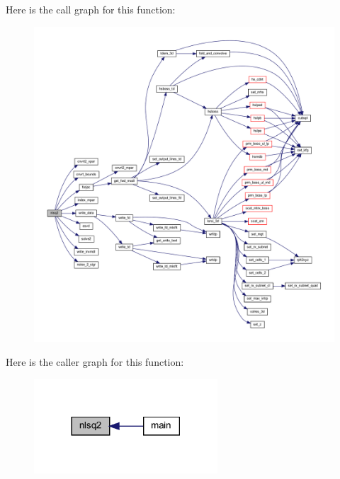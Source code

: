 Here is the call graph for this function\+:\nopagebreak
\begin{figure}[H]
\begin{center}
\leavevmode
\includegraphics[width=350pt]{Leroi_8f90_a8f13594331f001917eefb525bce81f61_cgraph}
\end{center}
\end{figure}
Here is the caller graph for this function\+:\nopagebreak
\begin{figure}[H]
\begin{center}
\leavevmode
\includegraphics[width=194pt]{Leroi_8f90_a8f13594331f001917eefb525bce81f61_icgraph}
\end{center}
\end{figure}
\mbox{\label{Leroi_8f90_aa11bf987208a116957b481b3765c8eaf}} 
